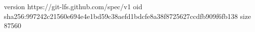 version https://git-lfs.github.com/spec/v1
oid sha256:997242c21560e694e4e1bd59c38aefd1bdcfe8a38f8725627ccdfb909f6fb138
size 87560
